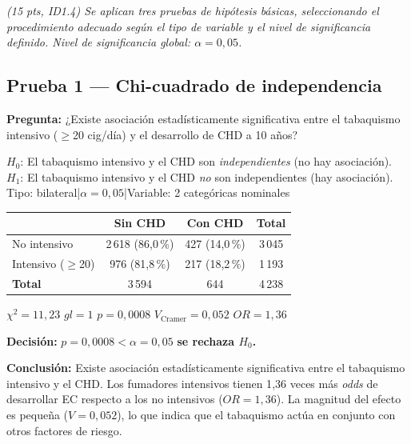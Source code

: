 \documentclass[11pt,a4paper]{article}
\newcommand{\guia}[1]{{\small\itshape\color{gris}#1}\par\vspace{0.15em}}
\begin{document}
\guia{(15 pts, ID1.4) Se aplican tres pruebas de hipótesis básicas, seleccionando el
procedimiento adecuado según el tipo de variable y el nivel de significancia definido.
Nivel de significancia global: $\alpha = 0{,}05$.}

\subsection{Prueba 1 — Chi-cuadrado de independencia}

\textbf{Pregunta:} ¿Existe asociación estadísticamente significativa entre el tabaquismo
intensivo ($\geq$20 cig/día) y el desarrollo de CHD a 10 años?

\begin{hipbox}
$H_0$: El tabaquismo intensivo y el CHD son \emph{independientes} (no hay asociación).\\
$H_1$: El tabaquismo intensivo y el CHD \emph{no} son independientes (hay asociación).\\
Tipo: bilateral\quad|\quad$\alpha = 0{,}05$\quad|\quad Variable: 2 categóricas nominales

\vspace{0.4em}
\begin{center}
\begin{tabular}{lccc}
\toprule
 & \textbf{Sin CHD} & \textbf{Con CHD} & \textbf{Total} \\
\midrule
No intensivo     & 2\,618 (86{,}0\,\%) & 427 (14{,}0\,\%) & 3\,045 \\
Intensivo ($\geq$20) & 976 (81{,}8\,\%)  & 217 (18{,}2\,\%) & 1\,193 \\
\midrule
\textbf{Total}   & 3\,594 & 644 & 4\,238 \\
\bottomrule
\end{tabular}
\end{center}

\vspace{0.4em}
$\chi^2 = 11{,}23$ \quad $gl = 1$ \quad $p = 0{,}0008$ \quad
$V_{\text{Cramer}} = 0{,}052$ \quad $OR = 1{,}36$

\vspace{0.4em}
\textbf{Decisión:} $p = 0{,}0008 < \alpha = 0{,}05$ \;\textrightarrow\; \textbf{se rechaza $H_0$.}

\textbf{Conclusión:} Existe asociación estadísticamente significativa entre el
tabaquismo intensivo y el CHD. Los fumadores intensivos tienen 1{,}36 veces más
\textit{odds} de desarrollar EC respecto a los no intensivos ($OR = 1{,}36$).
La magnitud del efecto es pequeña ($V = 0{,}052$), lo que indica que el tabaquismo
actúa en conjunto con otros factores de riesgo.
\end{hipbox}
\end{document}
